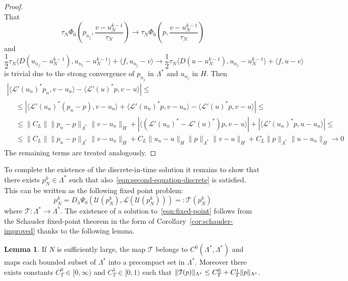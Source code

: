 \documentclass[a4paper,10pt,oneside]{amsbook}
\numberwithin{section}{chapter}
\numberwithin{equation}{chapter}
\theoremstyle{definition}
\newtheorem{lemma}[prop]{Lemma}
\DeclarePairedDelimiter{\norm}{\lVert}{\rVert}
\begin{document}
\begin{proof}
\[\]
That
\[
\tau_N\Phi_0\left(p_{n_j},\frac{v-u_N^{k-1}}{\tau_N}\right)\to\tau_N\Phi_0\left(p,\frac{v-u_N^{k-1}}{\tau_N}\right)
\]
and
\[
\frac{1}{2}\tau_N\langle D(u_{n_j}-u_N^{k-1}),u_{n_j}-u_N^{k-1}\rangle+\langle f,u_{n_j}-v\rangle\to\frac{1}{2}\tau_N\langle D(u-u_N^{k-1}),u_{n_j}-u_N^{k-1}\rangle+\langle f,u-v\rangle
\]
is trivial due to the strong convergence of $p_{n_j}$ in $\Lambda^*$ and $u_{n_j}$ in $H$. Then
\[
\begin{multlined}
\left|\langle\mathcal{L}'(u_n)^*p_n,v-u_n\rangle-\langle\mathcal{L}'(u)^*p,v-u\rangle\right|\le\\
\begin{split}
&\le\left|\langle\mathcal{L}'(u_n)^*(p_n-p),v-u_n\rangle+\langle\mathcal{L}'(u_n)^*p,v-u_n\rangle-\langle\mathcal{L}'(u)^*p,v-u\rangle\right|\le\\
&\le\|C_L\|\|p_n-p\|_{\Lambda^*}\|v-u_n\|_H+\left|\langle(\mathcal{L}'(u_n)^*-\mathcal{L}'(u)^*)p,v-u\rangle\right|+\left|\langle\mathcal{L}'(u_n)^*p,u-u_n\rangle\right|\le\\
&\le\|C_L\|\|p_n-p\|_{\Lambda^*}\|v-u_n\|_H+C_L\|u_n-u\|_H\|p\|_{\Lambda^*}\|v-u\|_H+C_L\|p\|_{\Lambda^*}\|u-u_n\|_H\to0
\end{split}
\end{multlined}
\]
The remaining terms are treated analogously.
\end{proof}
To complete the existence of the discrete-in-time solution it remains to show that there exists $p_N^k\in\Lambda^*$ such that also~\eqref{eqn:second-equation-discrete} is satisfied. This can be written as the following fixed point problem:
\begin{equation}
\label{eqn:fixed-point}
p_N^k=D_\lambda\Psi_0(\mathcal{U}(p_N^k),\mathcal{L}(\mathcal{U}(p_N^k)))=:\mathcal{T}(p_N^k)
\end{equation}
where $\mathcal{T}\colon\Lambda^*\to\Lambda^*$. The existence of a solution to~\eqref{eqn:fixed-point} follows from the Schauder fixed-point theorem in the form of Corollary~\ref{cor:schauder-improved} thanks to the following lemma.
\begin{lemma}
If $N$ is sufficiently large, the map $\mathcal{T}$ belongs to $C^0(\Lambda^*,\Lambda^*)$ and maps each bounded subset of $\Lambda^*$ into a precompact set in $\Lambda^*$. Moreover there exists constants $C_T^0\in[0,\infty)$ and $C_T^1\in[0,1)$ such that $\norm{\mathcal{T}(p)}_{\Lambda^*}\le C_T^0+C_T^1\norm{p}_{\Lambda^*}$.
\end{lemma}
\end{document}
